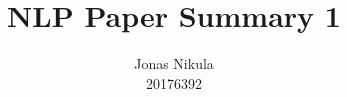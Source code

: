 \documentclass{article}
\title{NLP Paper Summary 1} %
\author{Jonas Nikula \\ 20176392} %
\date{} %
\begin{document}
\maketitle %






\printbibliography{}

\end{document}
